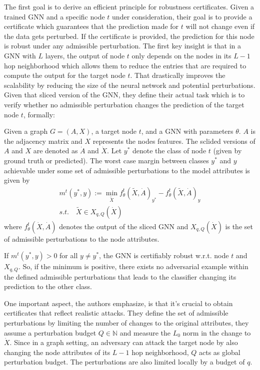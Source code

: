\documentclass[a4paper,preprint]{sig-alternate}
\begin{document}
The first goal is to derive an efficient principle for robustness certificates. Given a trained GNN and a specific node $t$ under consideration,
their goal is to provide a certificate which guarantees that the prediction made for $t$ will not change even if the data gets perturbed.
If the certificate is provided, the prediction for this node is robust under any admissible perturbation.\newline
The first key insight is that in a GNN with $L$ layers, the output of node $t$ only depends on the nodes in its $L-1$ hop neighborhood
which allows them to reduce the entries that are required to compute the output for the target node $t$. That drastically improves the scalability
by reducing the size of the neural network and potential perturbations. Given that sliced version of the GNN, they define their actual
task which is to verify whether no admissible perturbation changes the prediction of the target node $t$, formally:\newline

Given a graph $G = (A, X)$, a target node $t$, and a GNN with parameters $\theta$. $A$ is the adjacency matrix and $X$ represents the nodes features.
The sclided versions of $A$ and $X$ are denoted as $\dot{A}$ and $\dot{X}$. Let $y^*$ denote the class of node $t$ (given by ground truth or predicted).
The worst case margin between classes $y^*$ and $y$ achievable under some set of admissible perturbations to the model attributes is given by
\begin{gather} 
\label{eq:1}
    m^t (y^*, y) := \min_{\tilde{X}} f_{\theta}^t(\tilde{X}, \dot{A})_{y^*} - f_{\theta}^t(\tilde{X}, \dot{A})_y \\
    s.t. \quad \tilde{X} \in X_{q, Q} (\dot{X})
\end{gather}
where $f_{\theta}^t(\dot{X}, \dot{A})$ denotes the output of the sliced GNN and $X_{q, Q} (\dot{X})$ is the set of admissible perturbations
to the node attributes.\newline

If $m^t (y^*, y) > 0$ for all $y \neq y^*$, the GNN is certifiably robust w.r.t. node $t$ and $X_{q, Q}$. So, if the minimum is positive,
there exists no adversarial example within the defined admissible perturbations that leads to the classifier changing its prediction to the other class.\newline

One important aspect, the authors emphasize, is that it's crucial to obtain certificates that reflect realistic attacks.
They define the set of admissible perturbations by limiting the number of changes to the original attributes, they assume a perturbation
budget $Q \in \mathbb{N}$ and measure the $L_0$ norm in the change to $\dot{X}$. Since in a graph setting, an adversary can attack the target node
by also changing the node attributes of its $L-1$ hop neighborhood, $Q$ acts as global perturbation budget. The perturbations are also limited locally
by a budget of $q$.\newline
\end{document}
